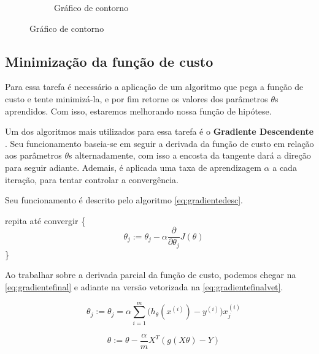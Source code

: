 \begin{figure}
\begin{subfigure}[htb]{0.5\textwidth}
    \caption{Gráfico de contorno} \label{fig:funcaodecustocontorno}
  \end{subfigure} 

\end{figure}


\subsection{Minimização da função de custo}

Para essa tarefa é necessário a aplicação de um algoritmo que pega a função de custo e tente minimizá-la, e por fim retorne os valores dos parâmetros $ \theta $s aprendidos. Com isso, estaremos melhorando nossa função de hipótese. 

Um dos algoritmos mais utilizados para essa tarefa é o \textbf{Gradiente Descendente} \cite{michalski2013machine}. Seu funcionamento baseia-se em seguir a derivada da função de custo em relação aos parâmetros $\theta$s alternadamente, com isso a encosta da tangente dará a direção para seguir adiante. Ademais, é aplicada uma taxa de aprendizagem $ \alpha $ a cada iteração, para tentar controlar a convergência.

Seu funcionamento é descrito pelo algoritmo \ref{eq:gradientedesc}.

repita até convergir \{
\begin{equation}
\label{eq:gradientedesc}
\quad \theta_j := \theta_j - \alpha \frac{\partial}{\partial\theta_j} J(\theta)
\end{equation}
\quad\quad\quad \}

Ao trabalhar sobre a derivada parcial da função de custo, podemos chegar na \autoref{eq:gradientefinal} e adiante na versão vetorizada na \autoref{eq:gradientefinalvet}. 

\begin{equation}
\quad \theta_j := \theta_j = \alpha \sum\limits_{i=1}^{m}\Big(h_{\theta}(x^{(i)}) - y^{(i)} \Big) x_j^{(i)} \label{eq:gradientefinal}
\end{equation}

\begin{equation}
\quad \theta := \theta - \frac{\alpha}{m}X^T(g(X\theta) - Y) \label{eq:gradientefinalvet}
\end{equation}

